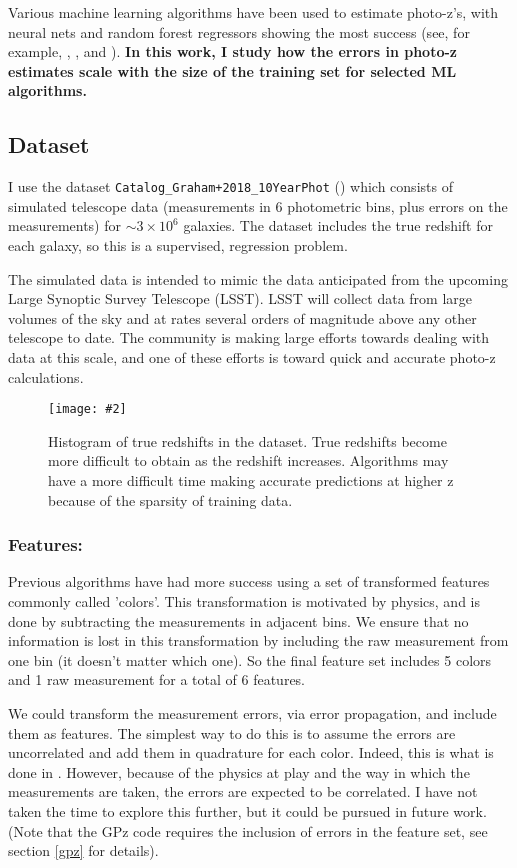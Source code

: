 \documentclass[13pt]{amsart}
\newcommand{\figscale}[4]{
\begin{figure}[h]
    \centering
    \caption{#3}
    \label{#4}
    \texttt{[image: \#2]}
\end{figure}
}
\begin{document}
  Various machine learning algorithms have been used to estimate photo-z's, with neural nets and random forest regressors showing the most success (see, for example, \cite{annz2}, \cite{tpz}, and \cite{pzreview}). \textbf{In this work, I study how the errors in photo-z estimates scale with the size of the training set for selected ML algorithms.}



  \subsection{Dataset}

    I use the dataset \texttt{Catalog\_Graham+2018\_10YearPhot} (\cite{graham}) which consists of simulated telescope data (measurements in 6 photometric bins, plus errors on the measurements) for $\sim3 \times 10^6$ galaxies. The dataset includes the true redshift for each galaxy, so this is a supervised, regression problem.

    The simulated data is intended to mimic the data anticipated from the upcoming Large Synoptic Survey Telescope (LSST). LSST will collect data from large volumes of the sky and at rates several orders of magnitude above any other telescope to date. The community is making large efforts towards dealing with data at this scale, and one of these efforts is toward quick and accurate photo-z calculations.

    \figscale{0.5}{../plots/figure_true_redshift_histogram.png}{Histogram of true redshifts in the dataset. True redshifts become more difficult to obtain as the redshift increases. Algorithms may have a more difficult time making accurate predictions at higher z because of the sparsity of training data.}{fig:zdist}

    \subsubsection{Features:}

      Previous algorithms have had more success using a set of transformed features commonly called 'colors'. This transformation is motivated by physics, and is done by subtracting the measurements in adjacent bins. We ensure that no information is lost in this transformation by including the raw measurement from one bin (it doesn't matter which one). So the final feature set includes 5 colors and 1 raw measurement for a total of 6 features.

      We could transform the measurement errors, via error propagation, and include them as features. The simplest way to do this is to assume the errors are uncorrelated and add them in quadrature for each color. Indeed, this is what is done in \cite{graham}. However, because of the physics at play and the way in which the measurements are taken, the errors are expected to be correlated. I have not taken the time to explore this further, but it could be pursued in future work. (Note that the GPz code requires the inclusion of errors in the feature set, see section \ref{gpz} for details).
\end{document}
